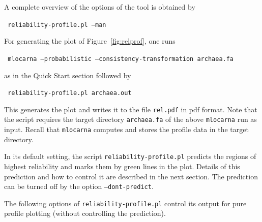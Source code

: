 \documentclass{article}
\newenvironment{ttbox}{%
  \begin{framed}\begin{minipage}{1.0\textwidth}\tt}%
{\end{minipage}\end{framed}\noindent}
\begin{document}
A complete overview of the options of the tool is obtained by
\begin{ttbox}
  reliability-profile.pl --man
\end{ttbox}

For generating the plot of Figure~\ref{fig:relprof}, one runs
\begin{ttbox}
  mlocarna --probabilistic --consistency-transformation archaea.fa
\end{ttbox}
as in the Quick Start section followed by
\begin{ttbox}
  reliability-profile.pl archaea.out
\end{ttbox}
This generates the plot and writes it to the file \texttt{rel.pdf} in
pdf format. Note that the script requires the target directory
\texttt{archaea.fa} of the above \texttt{mlocarna} run as
input. Recall that \texttt{mlocarna} computes and stores the profile
data in the target directory.

In its default setting, the script \texttt{reliability-profile.pl}
predicts the regions of highest reliability and marks them by green
lines in the plot. Details of this prediction and how to control it
are described in the next section. The prediction can be turned off by
the option \texttt{--dont-predict}.

The following options of \texttt{reliability-profile.pl} control its
output for pure profile plotting (without controlling the prediction). 
\end{document}
